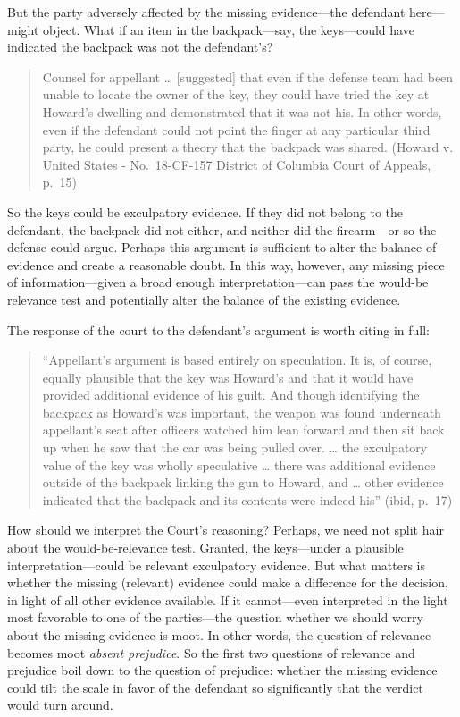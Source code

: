 \documentclass[
  10pt,
  dvipsnames,enabledeprecatedfontcommands]{scrartcl}
\begin{document}
But the party adversely affected by the missing evidence---the defendant
here---might object. What if an item in the backpack---say, the
keys---could have indicated the backpack was not the defendant's?

\begin{quote}
Counsel for appellant \ldots{} {[}suggested{]} that even if the defense
team had been unable to locate the owner of the key, they could have
tried the key at Howard's dwelling and demonstrated that it was not his.
In other words, even if the defendant could not point the finger at any
particular third party, he could present a theory that the backpack was
shared. (Howard v. United States - No.~18-CF-157 District of Columbia
Court of Appeals, p.~15)
\end{quote}

\noindent So the keys could be exculpatory evidence. If they did not
belong to the defendant, the backpack did not either, and neither did
the firearm---or so the defense could argue. Perhaps this argument is
sufficient to alter the balance of evidence and create a reasonable
doubt. In this way, however, any missing piece of information---given a
broad enough interpretation---can pass the would-be relevance test and
potentially alter the balance of the existing evidence.

The response of the court to the defendant's argument is worth citing in
full:

\begin{quote}
``Appellant's argument is based entirely on speculation. It is, of
course, equally plausible that the key was Howard's and that it would
have provided additional evidence of his guilt. And though identifying
the backpack as Howard's was important, the weapon was found underneath
appellant's seat after officers watched him lean forward and then sit
back up when he saw that the car was being pulled over. \ldots{} the
exculpatory value of the key was wholly speculative \ldots{} there was
additional evidence outside of the backpack linking the gun to Howard,
and \ldots{} other evidence indicated that the backpack and its contents
were indeed his'' (ibid, p.~17)
\end{quote}

\noindent How should we interpret the Court's reasoning? Perhaps, we
need not split hair about the would-be-relevance test. Granted, the
keys---under a plausible interpretation---could be relevant exculpatory
evidence. But what matters is whether the missing (relevant) evidence
could make a difference for the decision, in light of all other evidence
available. If it cannot---even interpreted in the light most favorable
to one of the parties---the question whether we should worry about the
missing evidence is moot. In other words, the question of relevance
becomes moot \emph{absent prejudice}. So the first two questions of
relevance and prejudice boil down to the question of prejudice: whether
the missing evidence could tilt the scale in favor of the defendant so
significantly that the verdict would turn around.
\end{document}
